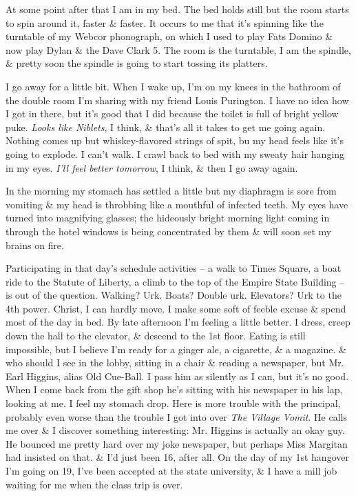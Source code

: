 \documentclass{article}
\numberwithin{equation}{section}
\begin{document}
At some point after that I am in my bed. The bed holds still but the room starts to spin around it, faster \& faster. It occurs to me that it's spinning like the turntable of my Webcor phonograph, on which I used to play Fats Domino \& now play Dylan \& the Dave Clark 5. The room is the turntable, I am the spindle, \& pretty soon the spindle is going to start tossing its platters.

I go away for a little bit. When I wake up, I'm on my knees in the bathroom of the double room I'm sharing with my friend Louis Purington. I have no idea how I got in there, but it's good that I did because the toilet is full of bright yellow puke. \textit{Looks like Niblets}, I think, \& that's all it takes to get me going again. Nothing comes up but whiskey-flavored strings of spit, bu my head feels like it's going to explode. I can't walk. I crawl back to bed with my sweaty hair hanging in my eyes. \textit{I'll feel better tomorrow}, I think, \& then I go away again.

In the morning my stomach has settled a little but my diaphragm is sore from vomiting \& my head is throbbing like a mouthful of infected teeth. My eyes have turned into magnifying glasses; the hideously bright morning light coming in through the hotel windows is being concentrated by them \& will soon set my brains on fire.

Participating in that day's schedule activities -- a walk to Times Square, a boat ride to the Statute of Liberty, a climb to the top of the Empire State Building -- is out of the question. Walking? Urk. Boats? Double urk. Elevators? Urk to the 4th power. Christ, I can hardly move. I make some soft of feeble excuse \& spend most of the day in bed. By late afternoon I'm feeling a little better. I dress, creep down the hall to the elevator, \& descend to the 1st floor. Eating is still impossible, but I believe I'm ready for a ginger ale, a cigarette, \& a magazine. \& who should I see in the lobby, sitting in a chair \& reading a newspaper, but Mr. Earl Higgins, alias Old Cue-Ball. I pass him as silently as I can, but it's no good. When I come back from the gift shop he's sitting with his newspaper in his lap, looking at me. I feel my stomach drop. Here is more trouble with the principal, probably even worse than the trouble I got into over \textit{The Village Vomit}. He calls me over \& I discover something interesting: Mr. Higgins is actually an okay guy. He bounced me pretty hard over my joke newspaper, but perhaps Miss Margitan had insisted on that. \& I'd just been 16, after all. On the day of my 1st hangover I'm going on 19, I've been accepted at the state university, \& I have a mill job waiting for me when the class trip is over.
\end{document}
